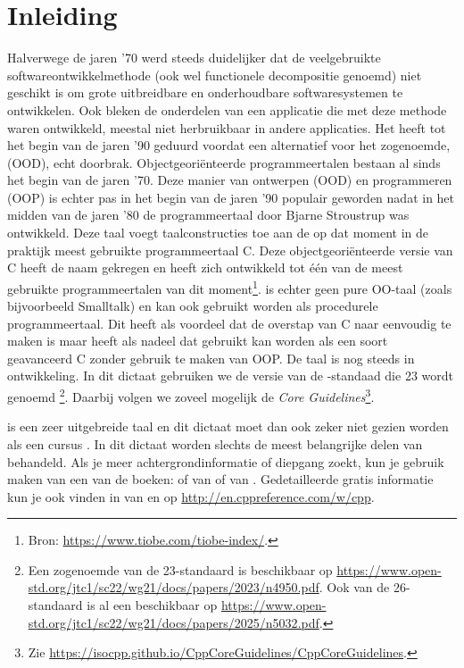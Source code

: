 \chapter*{Inleiding}
Halverwege de jaren '70 werd steeds duidelijker dat de veelgebruikte softwareontwikkelmethode  (ook wel functionele decompositie genoemd) niet geschikt is om grote uitbreidbare en onderhoudbare softwaresystemen te ontwikkelen.
Ook bleken de onderdelen van een applicatie die met deze methode waren ontwikkeld, meestal niet herbruikbaar in andere applicaties.
Het heeft tot het begin van de jaren '90 geduurd voordat een alternatief voor  het zogenoemde,  (OOD), echt doorbrak.
Objectgeoriënteerde programmeertalen bestaan al sinds het begin van de jaren '70.
Deze manier van ontwerpen (OOD) en programmeren (OOP) is echter pas in het begin van de jaren '90 populair geworden nadat in het midden van de jaren '80 de programmeertaal \Cpp{} door Bjarne Stroustrup was ontwikkeld.
Deze taal voegt taalconstructies toe aan de op dat moment in de praktijk meest gebruikte programmeertaal C.
Deze objectgeoriënteerde versie van C heeft de naam \Cpp{} gekregen en heeft zich ontwikkeld tot één van de meest gebruikte programmeertalen van dit moment\footnote{%
	Bron: \url{https://www.tiobe.com/tiobe-index/}.
}.
\Cpp{} is echter geen pure OO-taal (zoals bijvoorbeeld Smalltalk) en kan ook gebruikt worden als procedurele programmeertaal.
Dit heeft als voordeel dat de overstap van C naar \Cpp{} eenvoudig te maken is maar heeft als nadeel dat \Cpp{} gebruikt kan worden als een soort geavanceerd C zonder gebruik te maken van OOP\@.
De taal \Cpp{} is nog steeds in ontwikkeling.
In dit dictaat gebruiken we de versie van de \Cpp{}\hyp{}standaad die \Cpp{}23 wordt genoemd \cite{ISO2023}%
\footnote{%
    Een zogenoemde  van de \Cpp{}23\hyp{}standaard is beschikbaar op \url{https://www.open-std.org/jtc1/sc22/wg21/docs/papers/2023/n4950.pdf}.
    Ook van de \Cpp{}26\hyp{}standaard is al een  beschikbaar op \url{https://www.open-std.org/jtc1/sc22/wg21/docs/papers/2025/n5032.pdf}.
}.
Daarbij volgen we zoveel mogelijk de \emph{\Cpp{} Core Guidelines}\footnote{
	Zie \url{https://isocpp.github.io/CppCoreGuidelines/CppCoreGuidelines}.
}.

\Cpp{} is een zeer uitgebreide taal en dit dictaat moet dan ook zeker niet gezien worden als een cursus \Cpp{}.
In dit dictaat worden slechts de meest belangrijke delen van \Cpp{} behandeld.
Als je meer achtergrondinformatie of diepgang zoekt, kun je gebruik maken van een van de boeken:  \cite{Stroustrup2022} of  \cite{Stroustrup2024} van \citeauthor{Stroustrup2022} of  \cite{Gregoire2024} van \citeauthor{Gregoire2024}.
Gedetailleerde gratis informatie kun je ook vinden in  \cite{Brokken2019} van \citeauthor{Brokken2019} en op \url{http://en.cppreference.com/w/cpp}. 

